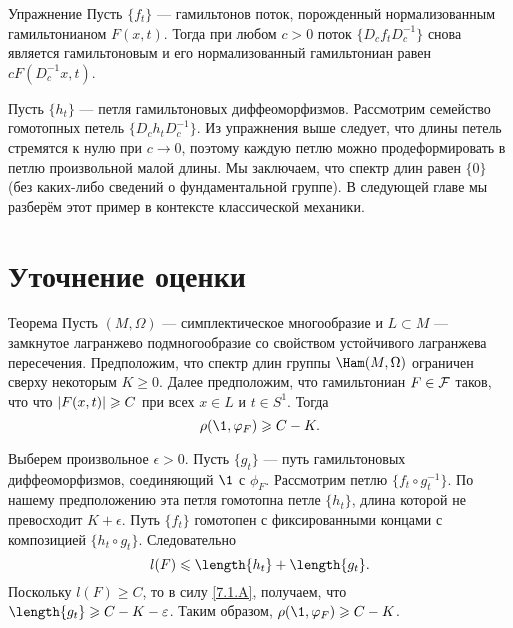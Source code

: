 \begin{ex*}{Упражнение}
Пусть $\{f_t\}$ — гамильтонов поток, порожденный нормализованным гамильтонианом $F (x, t)$.
Тогда при любом $c> 0$ поток $\{D_c f_t D_c^{-1}\}$ снова является
гамильтоновым и его нормализованный гамильтониан равен $cF (D_c^{-1} x, t)$.
\end{ex*}

Пусть $\{h_t\}$ — петля гамильтоновых диффеоморфизмов.
Рассмотрим семейство гомотопных петель $\{D_c h_t D_c ^{-1}\}$.
Из упражнения выше следует, что длины петель стремятся к нулю при $c \to 0$, поэтому каждую петлю можно продеформировать в петлю произвольной малой длины.
Мы заключаем, что спектр длин равен $\{0\}$ (без каких-либо сведений о фундаментальной группе).
В следующей главе мы разберём этот пример в контексте классической механики.

\section{Уточнение оценки}

\begin{thm}{Теорема}\label{7.4.A}
Пусть $(M, \Omega)$ — симплектическое многообразие и $L \subset M$
— замкнутое лагранжево подмногообразие со свойством устойчивого
лагранжева пересечения. 
Предположим, что спектр длин группы $\Ham (M, \Omega)$ ограничен
сверху некоторым $K \ge 0$. 
Далее предположим, что гамильтониан $F \in \mathcal{F}$ таков, что что $| F (x,
t) | \z\ge C$ при всех $x \in L$ и $t \in S^1$. 
Тогда 
\[\rho (\1, \phi_F) \ge C - K.\]
\end{thm}

Выберем произвольное $\epsilon> 0$. 
Пусть $\{g_t\}$ — путь гамильтоновых диффеоморфизмов, соединяющий $\1$ с $\phi_F$.
Рассмотрим петлю $\{f_t \circ g_t ^{-1}\}$.
По нашему предположению эта петля гомотопна петле $\{h_t\}$, длина которой не превосходит $K + \epsilon$.
Путь $\{f_t\}$ гомотопен с фиксированными концами с композицией $\{h_t \circ g_t\}$.
Следовательно
\[l (F) \le \length \{h_t\} + \length \{g_t\}.\]
Поскольку $l (F) \ge C$, то в силу \ref{7.1.A}, получаем, что $\length \{g_t\} \ge C \z- K - \epsilon$.
Таким образом, $\rho (\1, \phi_F) \ge C - K$.
\qeds
